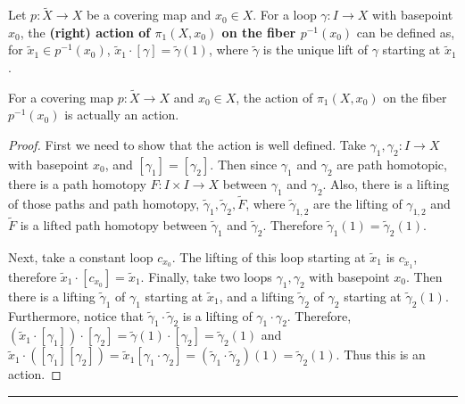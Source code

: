 \begin{defn} Let $p:\tilde{X}\rightarrow X$ be a covering map and $x_0\in X$. For a loop $\gamma:I\rightarrow X$ with basepoint $x_0$, the \textbf{(right) action of $\pi_1(X,x_0)$ on the fiber $p^{-1}(x_0)$} can be defined as, for $\tilde{x}_1\in p^{-1}(x_0)$, $\tilde{x}_1\cdot [\gamma]=\tilde{\gamma}(1)$, where $\tilde{\gamma}$ is the unique lift of $\gamma$ starting at $\tilde{x}_1$.
\end{defn}

\begin{prop} For a covering map $p:\tilde{X}\rightarrow X$ and $x_0\in X$, the action of $\pi_1(X,x_0)$ on the fiber $p^{-1}(x_0)$ is actually an action.
\end{prop}
\begin{proof}
First we need to show that the action is well defined. Take $\gamma_1,\gamma_2:I\rightarrow X$ with basepoint $x_0$, and $[\gamma_1]=[\gamma_2]$. Then since $\gamma_1$ and $\gamma_2$ are path homotopic, there is a path homotopy $F:I\times I\rightarrow X$ between $\gamma_1$ and $\gamma_2$. Also, there is a lifting of those paths and path homotopy, $\tilde{\gamma}_1, \tilde{\gamma}_2,\tilde{F}$, where $\tilde{\gamma}_{1,2}$ are the lifting of $\gamma_{1,2}$ and $\tilde{F}$ is a lifted path homotopy between $\tilde{\gamma}_1$ and $\tilde{\gamma}_2$. Therefore $\tilde{\gamma}_1(1)=\tilde{\gamma}_2(1)$.

Next, take a constant loop $c_{x_0}$. The lifting of this loop starting at $\tilde{x}_1$ is $c_{\tilde{x}_1}$, therefore $\tilde{x}_1\cdot [c_{x_0}]=\tilde{x}_1$. Finally, take two loops $\gamma_1, \gamma_2$ with basepoint $x_0$. Then there is a lifting $\tilde{\gamma}_1$ of $\gamma_1$ starting at $\tilde{x}_1$, and a lifting $\tilde{\gamma}_2$ of $\gamma_2$ starting at $\tilde{\gamma}_2(1)$. Furthermore, notice that $\tilde{\gamma}_1\cdot \tilde{\gamma}_2$ is a lifting of $\gamma_1\cdot \gamma_2$. Therefore, $(\tilde{x}_1\cdot [\gamma_1])\cdot [\gamma_2]=\tilde{\gamma}(1)\cdot [\gamma_2]=\tilde{\gamma}_2(1)$ and $\tilde{x}_1\cdot([\gamma_1][\gamma_2])=\tilde{x}_1[\gamma_1\cdot \gamma_2]=(\tilde{\gamma}_1\cdot \tilde{\gamma}_2)(1)=\tilde{\gamma}_2(1).$ Thus this is an action.
\end{proof}
\noindent\rule{\textwidth}{1pt}
\newline